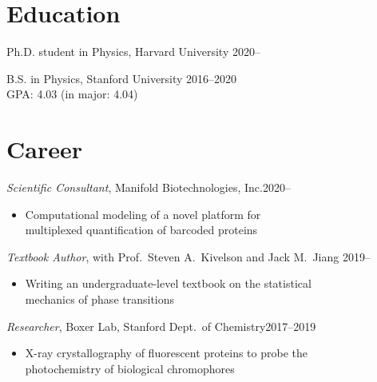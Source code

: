 \documentclass[margin,11pt]{res}
\newenvironment{myitemize}
{ \vspace{-1.5\topsep} \begin{itemize} \setlength\itemsep{0em}}
{ \end{itemize} \vspace{-1.0\topsep}}
\begin{document}
\address{jeffrey\_chang@g.harvard.edu --- \url{https://jeffjar.me}}

\begin{resume}

\section{Education}

Ph.D. student in Physics, Harvard University \hfill 2020--

B.S. in Physics, Stanford University \hfill 2016--2020 \\
GPA: 4.03 (in major: 4.04)
 

\section{Career}

\textit{Scientific Consultant}, Manifold Biotechnologies, Inc.\hfill 2020--\\
\begin{myitemize}
    \item Computational modeling of a novel platform for\\
        multiplexed quantification of barcoded proteins
\end{myitemize}

\textit{Textbook Author}, with Prof.\ Steven A.\ Kivelson and Jack M.\ Jiang  \hfill 2019--\\
\begin{myitemize}
    \item Writing an undergraduate-level textbook on the statistical\\
        mechanics of phase transitions
\end{myitemize}

\textit{Researcher}, Boxer Lab, Stanford Dept.\ of Chemistry\hfill 2017--2019 \\
\begin{myitemize}
    \item X-ray crystallography of fluorescent proteins to probe the\\ photochemistry of biological chromophores
\end{myitemize}


\end{resume}
\end{document}
